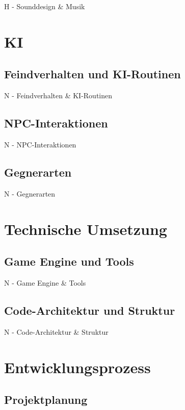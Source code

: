 \documentclass[oneside]{ausarbeitung}
\begin{document}
H - Sounddesign & Musik


\chapter{KI}

\section{Feindverhalten und KI-Routinen}

N - Feindverhalten & KI-Routinen


\section{NPC-Interaktionen}

N - NPC-Interaktionen


\section{Gegnerarten}

N - Gegnerarten


\chapter{Technische Umsetzung}

\section{Game Engine und Tools}

N - Game Engine & Tools


\section{Code-Architektur und Struktur}

N - Code-Architektur & Struktur


\chapter{Entwicklungsprozess}

\section{Projektplanung}
\end{document}
